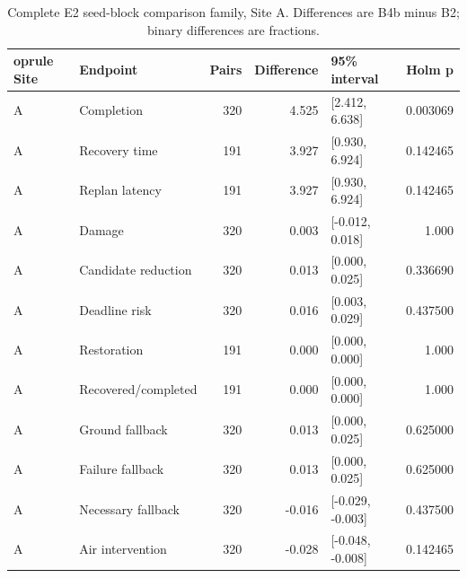 \begin{table}[H]\centering\footnotesize
\caption{Complete E2 seed-block comparison family, Site A. Differences are B4b minus B2; binary differences are fractions.}\label{tab:e2_A}
\begin{tabularx}{\textwidth}{@{}lYrrYr@{}}	oprule
Site & Endpoint & Pairs & Difference & 95\% interval & Holm p \\\midrule
A & Completion & 320 & 4.525 & [2.412, 6.638] & 0.003069 \\
A & Recovery time & 191 & 3.927 & [0.930, 6.924] & 0.142465 \\
A & Replan latency & 191 & 3.927 & [0.930, 6.924] & 0.142465 \\
A & Damage & 320 & 0.003 & [-0.012, 0.018] & 1.000 \\
A & Candidate reduction & 320 & 0.013 & [0.000, 0.025] & 0.336690 \\
A & Deadline risk & 320 & 0.016 & [0.003, 0.029] & 0.437500 \\
A & Restoration & 191 & 0.000 & [0.000, 0.000] & 1.000 \\
A & Recovered/completed & 191 & 0.000 & [0.000, 0.000] & 1.000 \\
A & Ground fallback & 320 & 0.013 & [0.000, 0.025] & 0.625000 \\
A & Failure fallback & 320 & 0.013 & [0.000, 0.025] & 0.625000 \\
A & Necessary fallback & 320 & -0.016 & [-0.029, -0.003] & 0.437500 \\
A & Air intervention & 320 & -0.028 & [-0.048, -0.008] & 0.142465 \\
\bottomrule\end{tabularx}\end{table}
